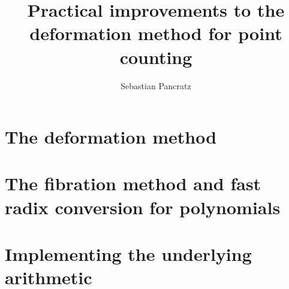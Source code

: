 \documentclass[a4paper,11pt]{book}
\author{Sebastian Pancratz}
\title{Practical improvements to the deformation method for point counting}
\numberwithin{equation}{chapter}
\theoremstyle{definition}
\begin{document}
\frontmatter



\tableofcontents

\mainmatter

{%
\part{The deformation method}

}

{%
\part{The fibration method and fast radix conversion for polynomials}

}

{%
\part{Implementing the underlying arithmetic}

}

\backmatter

{}



\end{document}
